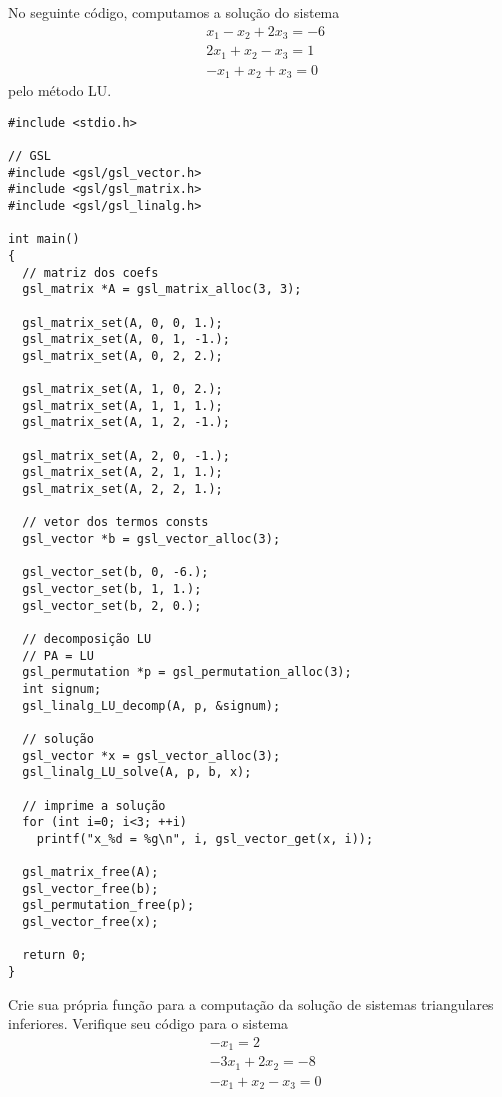 \documentclass[12pt]{article}
\begin{document}
\begin{ex}
  No seguinte código, computamos a solução do sistema
  \begin{equation}
    \begin{aligned}
      &x_1 - x_2 + 2x_3 = -6\\
      &2x_1 + x_2 - x_3 = 1\\
      &-x_1 + x_2 + x_3 = 0
    \end{aligned}
  \end{equation}
  pelo método LU.

\begin{lstlisting}[caption=lu.cc]
#include <stdio.h>

// GSL
#include <gsl/gsl_vector.h>
#include <gsl/gsl_matrix.h>
#include <gsl/gsl_linalg.h>

int main()
{
  // matriz dos coefs
  gsl_matrix *A = gsl_matrix_alloc(3, 3);
  
  gsl_matrix_set(A, 0, 0, 1.);
  gsl_matrix_set(A, 0, 1, -1.);
  gsl_matrix_set(A, 0, 2, 2.);

  gsl_matrix_set(A, 1, 0, 2.);
  gsl_matrix_set(A, 1, 1, 1.);
  gsl_matrix_set(A, 1, 2, -1.);

  gsl_matrix_set(A, 2, 0, -1.);
  gsl_matrix_set(A, 2, 1, 1.);
  gsl_matrix_set(A, 2, 2, 1.);

  // vetor dos termos consts
  gsl_vector *b = gsl_vector_alloc(3);

  gsl_vector_set(b, 0, -6.);
  gsl_vector_set(b, 1, 1.);
  gsl_vector_set(b, 2, 0.);

  // decomposição LU
  // PA = LU
  gsl_permutation *p = gsl_permutation_alloc(3);
  int signum;
  gsl_linalg_LU_decomp(A, p, &signum);

  // solução
  gsl_vector *x = gsl_vector_alloc(3);
  gsl_linalg_LU_solve(A, p, b, x);

  // imprime a solução
  for (int i=0; i<3; ++i)
    printf("x_%d = %g\n", i, gsl_vector_get(x, i));

  gsl_matrix_free(A);
  gsl_vector_free(b);
  gsl_permutation_free(p);
  gsl_vector_free(x);
  
  return 0;
}
\end{lstlisting}
\end{ex}

\begin{exr}\label{exr:sisLinInf}
  Crie sua própria função para a computação da solução de sistemas triangulares inferiores. Verifique seu código para o sistema
  \begin{equation}
    \begin{aligned}
      &-x_1 = 2\\
      &-3x_1 + 2x_2 = -8\\
      &-x_1 + x_2 - x_3 = 0
    \end{aligned}
  \end{equation}
\end{exr}
\end{document}
